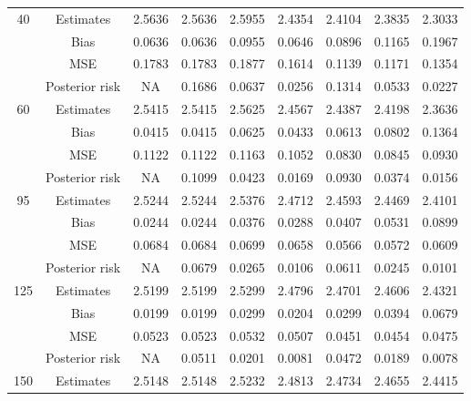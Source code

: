 \documentclass[a4paper,12pt]{report}
\begin{document}
{\begin{minipage}{\linewidth}
{\begin{tabular}{|c|c|c|c|c|c|c|c|c|}
			40&		Estimates      &2.5636 &2.5636 &2.5955 &2.4354 &2.4104 &2.3835 &2.3033 \\
			&Bias           &0.0636 &0.0636 &0.0955 &0.0646 &0.0896 &0.1165 &0.1967 \\
			&MSE            &0.1783 &0.1783 &0.1877 &0.1614 &0.1139 &0.1171 &0.1354 \\
			&Posterior risk    &NA &0.1686 &0.0637 &0.0256 &0.1314 &0.0533 &0.0227 \\ \hline
			60&		Estimates      &2.5415 &2.5415 &2.5625 &2.4567 &2.4387 &2.4198 &2.3636 \\
			&Bias           &0.0415 &0.0415 &0.0625 &0.0433 &0.0613 &0.0802 &0.1364 \\
			&MSE            &0.1122 &0.1122 &0.1163 &0.1052 &0.0830 &0.0845 &0.0930 \\
		 	&Posterior risk    &NA &0.1099 &0.0423 &0.0169 &0.0930 &0.0374 &0.0156 \\\hline
			95&		Estimates      &2.5244 &2.5244 &2.5376 &2.4712 &2.4593 &2.4469 &2.4101 \\
			&Bias           &0.0244 &0.0244 &0.0376 &0.0288 &0.0407 &0.0531 &0.0899 \\
			&MSE            &0.0684 &0.0684 &0.0699 &0.0658 &0.0566 &0.0572 &0.0609 \\
			&Posterior risk    &NA &0.0679 &0.0265 &0.0106 &0.0611 &0.0245 &0.0101 \\ \hline
			125&	Estimates      &2.5199 &2.5199 &2.5299 &2.4796 &2.4701 &2.4606 &2.4321 \\
			&Bias           &0.0199 &0.0199 &0.0299 &0.0204 &0.0299 &0.0394 &0.0679 \\
			&MSE            &0.0523 &0.0523 &0.0532 &0.0507 &0.0451 &0.0454 &0.0475 \\
			&Posterior risk    &NA &0.0511 &0.0201 &0.0081 &0.0472 &0.0189 &0.0078 \\ \hline
			150		&Estimates      &2.5148 &2.5148 &2.5232 &2.4813 &2.4734 &2.4655 &2.4415 \\

\end{tabular}}
\end{minipage}}
\end{document}
